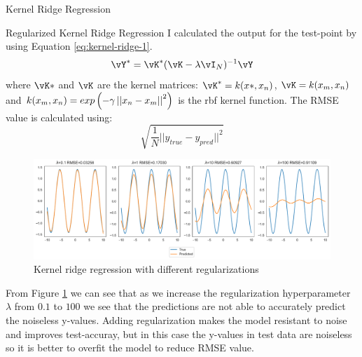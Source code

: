 \documentclass[a4paper,11pt]{article}
\begin{document}
\begin{mlsolution}

    \begin{section}{Kernel Ridge Regression}
        \begin{subsection}{Regularized Kernel Ridge Regression}
            I calculated the output for the test-point by using Equation \ref{eq:kernel-ridge-1}.
            \begin{equation}
                \label{eq:kernel-ridge-1}
                \vY^*=\vK^*(\vK-\lambda \vI_N)^{-1}\vY
            \end{equation}
            where $\vK*$ and $\vK$ are the kernel matrices: $\vK^*=k(x*,x_n)$, $\vK=k(x_m,x_n)$ and $k(x_m,x_n) = exp\left( -\gamma\left| {\left| {x_n - x_m} \right|} \right|^2 \right)$ is the rbf kernel function.
            The RMSE value is calculated using: $$\sqrt{\frac{1}{N}||y_{true} - y_{pred}|| ^2}$$
            \begin{figure}[h]
                \includegraphics[width=\textwidth]{images/kernel-ridge-regression.pdf}
                \caption{Kernel ridge regression with different regularizations}
                \label{fig:kernel-rdge-regression}
            \end{figure}
            
            From Figure \ref{fig:kernel-rdge-regression} we can see that as we increase the regularization hyperparameter $\lambda$ from $0.1$ to $100$ we see that the predictions are not able to accurately predict the noiseless y-values. Adding regularization makes the model resistant to noise and improves test-accuray, but in this case the y-values in test data are noiseless so it is better to overfit the model to reduce RMSE value.
        \end{subsection}

\end{section}
\end{mlsolution}
\end{document}

